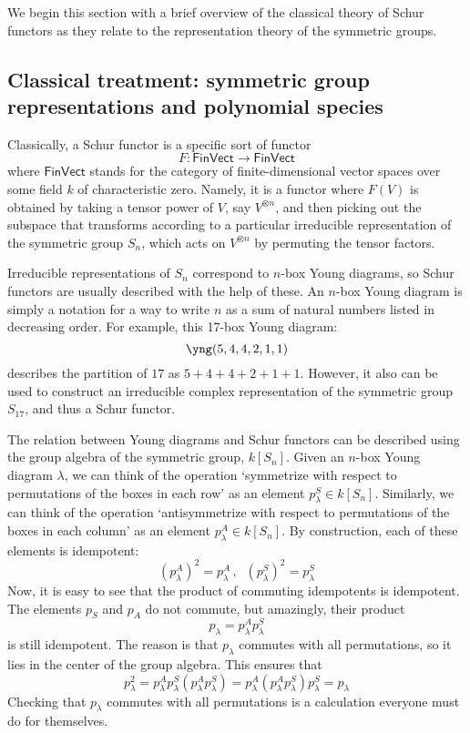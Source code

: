 \documentclass[12pt,reqno]{amsart}
\theoremstyle{plain}
\theoremstyle{definition}
\theoremstyle{remark}
\newcommand{\maps}{\colon}
\newcommand{\namedcat}[1]{\mathsf{#1}}
\newcommand{\Vect}{\namedcat{Vect}}
\newcommand{\Fin}{\namedcat{Fin}}
\numberwithin{thm}{section}
\begin{document}
We begin this section with a brief overview of the classical theory of Schur functors as they relate to the representation theory of the symmetric groups. 

\subsection{Classical treatment: symmetric group representations and polynomial species}
Classically, a Schur functor is a specific sort of functor
\[  
    F \maps \Fin\Vect \to \Fin\Vect
\]
where $\Fin\Vect$ stands for the category of finite-dimensional vector spaces over some field $k$ of characteristic zero. Namely, it is a functor where $F(V)$ is obtained by taking a tensor power of $V$, say $V^{\otimes n}$, and then picking out the subspace that transforms according to a particular irreducible representation of the symmetric group $S_n$, which acts on $V^{\otimes n}$ by permuting the tensor factors. 

Irreducible representations of $S_n$ correspond to $n$-box Young diagrams, so Schur functors are usually described with the help of these. An $n$-box Young diagram is simply a notation for a way to write $n$ as a sum of natural numbers listed in decreasing order. For example, this 17-box Young diagram:
\[
    \yng(5,4,4,2,1,1) 
\]
describes the partition of $17$ as $5 + 4 + 4 + 2 + 1 + 1$. However, it also can be used to construct an irreducible complex representation of the symmetric group $S_{17}$, and thus a Schur functor. 

The relation between Young diagrams and Schur functors can be described using the group algebra of the symmetric group, $k[S_n]$. Given an $n$-box Young diagram $\lambda$, we can think of the operation `symmetrize with respect to permutations of the boxes in each row' as an element $p^S_\lambda \in k[S_n]$. Similarly, we can think of the operation `antisymmetrize with respect to permutations of the boxes in each column' as an element $p^A_\lambda \in k[S_n]$. By construction, each of these elements is idempotent:
\[
    (p^A_\lambda)^2 = p^A_\lambda \, , \; \; (p^S_\lambda)^2 = p^S_\lambda  
\]
Now, it is easy to see that the product of commuting idempotents is idempotent. The elements $p_S$ and $p_A$ do not commute, but amazingly, their product 
\[ 
    p_\lambda = p^A_\lambda p^S_\lambda 
\]
is still idempotent. The reason is that $p_\lambda$ commutes with all permutations, so it lies in the center of the group algebra. This ensures that
\[ 
    p_\lambda^2 = p^A_\lambda p^S_\lambda (p^A_\lambda p^S_\lambda) =
    p^A_\lambda (p^A_\lambda p^S_\lambda) p^S_\lambda = p_\lambda 
\]
Checking that $p_\lambda$ commutes with all permutations is a calculation everyone must do for themselves.
\end{document}
